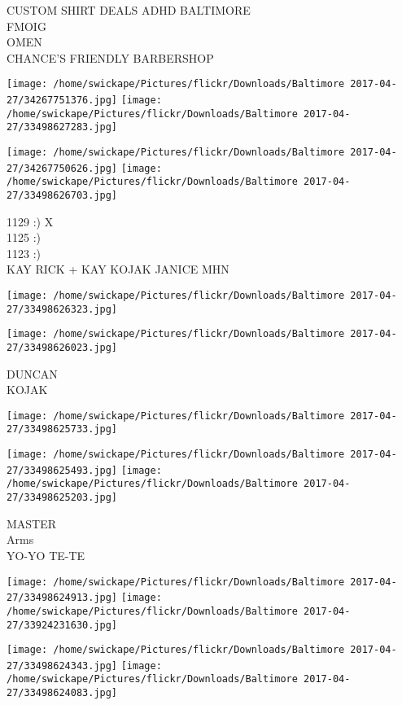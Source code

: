 \documentclass[10pt,letterpaper]{article}
\begin{document}
CUSTOM SHIRT DEALS ADHD BALTIMORE\\
FMOIG\\
OMEN\\
CHANCE'S FRIENDLY BARBERSHOP\\
\pagebreak

\texttt{[image: /home/swickape/Pictures/flickr/Downloads/Baltimore 2017-04-27/34267751376.jpg]}
\texttt{[image: /home/swickape/Pictures/flickr/Downloads/Baltimore 2017-04-27/33498627283.jpg]}

\texttt{[image: /home/swickape/Pictures/flickr/Downloads/Baltimore 2017-04-27/34267750626.jpg]}
\texttt{[image: /home/swickape/Pictures/flickr/Downloads/Baltimore 2017-04-27/33498626703.jpg]}

1129 :) X\\
1125 :)\\
1123 :)\\
KAY RICK + KAY KOJAK JANICE MHN\\
\pagebreak

\texttt{[image: /home/swickape/Pictures/flickr/Downloads/Baltimore 2017-04-27/33498626323.jpg]}

\vspace{0.25in}
\texttt{[image: /home/swickape/Pictures/flickr/Downloads/Baltimore 2017-04-27/33498626023.jpg]}

DUNCAN\\
KOJAK\\
\pagebreak

\texttt{[image: /home/swickape/Pictures/flickr/Downloads/Baltimore 2017-04-27/33498625733.jpg]}

\vspace{0.25in}
\texttt{[image: /home/swickape/Pictures/flickr/Downloads/Baltimore 2017-04-27/33498625493.jpg]}
\texttt{[image: /home/swickape/Pictures/flickr/Downloads/Baltimore 2017-04-27/33498625203.jpg]}

MASTER\\
Arms\\
YO{-}YO TE{-}TE\\
\pagebreak

\texttt{[image: /home/swickape/Pictures/flickr/Downloads/Baltimore 2017-04-27/33498624913.jpg]}
\texttt{[image: /home/swickape/Pictures/flickr/Downloads/Baltimore 2017-04-27/33924231630.jpg]}

\texttt{[image: /home/swickape/Pictures/flickr/Downloads/Baltimore 2017-04-27/33498624343.jpg]}
\texttt{[image: /home/swickape/Pictures/flickr/Downloads/Baltimore 2017-04-27/33498624083.jpg]}
\end{document}
